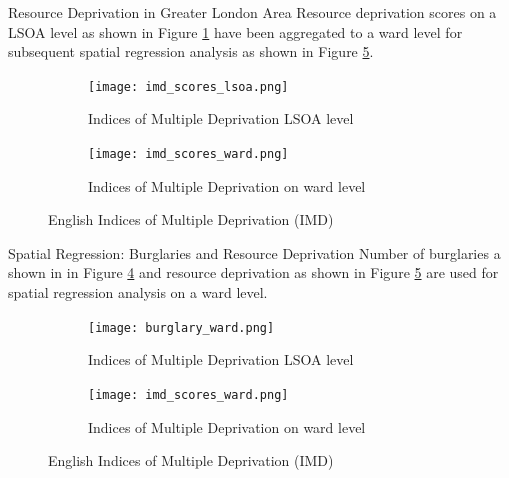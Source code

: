 \documentclass[10pt, aspectratio=169]{beamer}
\begin{document}
\begin{frame}{Resource Deprivation in Greater London Area}
    Resource deprivation scores on a LSOA level as shown in Figure \ref{fig:imd_scores_lsoa}
    have been aggregated to a ward level for subsequent spatial regression analysis
    as shown in Figure \ref{fig:imd_scores_ward}.
    \begin{figure}
        \centering
            \begin{subfigure}[t]{0.4\textwidth}
                \texttt{[image: imd\_scores\_lsoa.png]}
                \caption{Indices of Multiple Deprivation LSOA level}\label{fig:imd_scores_lsoa}
            \end{subfigure}
            \begin{subfigure}[t]{0.4\textwidth}
                \texttt{[image: imd\_scores\_ward.png]}
                \caption{Indices of Multiple Deprivation on ward level}\label{fig:imd_scores_ward}
            \end{subfigure}
        \caption{English Indices of Multiple Deprivation (IMD)}\label{fig:imd}
    \end{figure}
\end{frame}


\begin{frame}{Spatial Regression: Burglaries and Resource Deprivation}
    Number of burglaries a shown in in Figure \ref{fig:burglary_ward} and resource deprivation as shown
    in Figure \ref{fig:imd_scores_ward} are used for spatial regression analysis on a ward level.
    \begin{figure}
        \centering
            \begin{subfigure}[t]{0.4\textwidth}
                \texttt{[image: burglary\_ward.png]}
                \caption{Indices of Multiple Deprivation LSOA level}\label{fig:burglary_ward}
            \end{subfigure}
            \begin{subfigure}[t]{0.4\textwidth}
                \texttt{[image: imd\_scores\_ward.png]}
                \caption{Indices of Multiple Deprivation on ward level}\label{fig:imd_scores_ward}
            \end{subfigure}
        \caption{English Indices of Multiple Deprivation (IMD)}\label{fig:burg_imd}
    \end{figure}
\end{frame}
\end{document}
